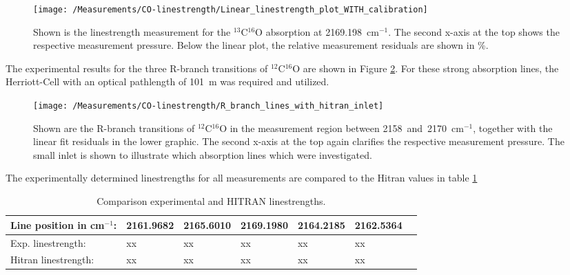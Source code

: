 \begin{figure}[H]
	\centering
	\texttt{[image: /Measurements/CO-linestrength/Linear\_linestrength\_plot\_WITH\_calibration]}
	\caption{Shown is the linestrength measurement for the $^{13}$C$^{16}$O absorption at \mbox{2169.198 cm$^{-1}$}. The second x-axis at the top  shows the respective measurement pressure. Below the linear plot, the relative measurement residuals are shown in \%.}
	\label{fig:Linear_linestrength_plot_WITH_calibration}
\end{figure}
\noindent
The experimental results for the three R-branch transitions of $^{12}$C$^{16}$O are shown in Figure \ref{fig:R-branch_transitions}. For these strong absorption lines, the Herriott-Cell with an optical pathlength of \mbox{101 m} was required and utilized.
\begin{figure}[H]
	\centering
	\texttt{[image: /Measurements/CO-linestrength/R\_branch\_lines\_with\_hitran\_inlet]}
	\caption{Shown are the R-branch transitions of $^{12}$C$^{16}$O in the measurement region between \mbox{2158 and 2170 cm$^{-1}$}, together with the linear fit residuals in the lower graphic. The second x-axis at the top again clarifies the respective measurement pressure. The small inlet is shown to illustrate which absorption lines which were investigated. }
	\label{fig:R-branch_transitions}
\end{figure}
\noindent
The experimentally determined linestrengths for all measurements are compared to the Hitran values in table \ref{table:linestrengths}
\begin{table}
	\begin{center}
		\begin{tabular}{ lllllll }
			\toprule
			Line position in cm$^{-1}$: & 2161.9682  & 2165.6010 & 2169.1980 & 2164.2185 & 2162.5364 & \\
			\midrule
			Exp. linestrength: & xx& xx& xx &  xx & xx &\\
			\midrule
			Hitran linestrength: & xx& xx& xx &  xx & xx &\\
			\bottomrule
		\end{tabular}
	\end{center}
	\caption{Comparison experimental and HITRAN linestrengths.}
	\label{table:linestrengths}
\end{table}\\\\
\newpage
